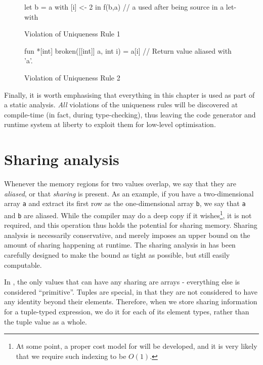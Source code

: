 \begin{figure}
\centering
\begin{colorcode}
let b = a with [i] <- 2 in
f(b,a) //  a used after being source in a let-with
\end{colorcode}
\caption{Violation of Uniqueness Rule 1}
\label{fig:uniqueness-rule-1-violation}
\end{figure}

\begin{figure}
\centering
\begin{colorcode}
fun *[int] broken([[int]] a, int i) =
  a[i] // Return value aliased with 'a'.
\end{colorcode}
\caption{Violation of Uniqueness Rule 2}
\label{fig:uniqueness-rule-2-violation}
\end{figure}

Finally, it is worth emphasising that everything in this chapter is
used as part of a static analysis.  \textit{All} violations of the
uniqueness rules will be discovered at compile-time (in fact, during
type-checking), thus leaving the code generator and runtime system at
liberty to exploit them for low-level optimisation.

\section{Sharing analysis}
\label{sec:l0-sharing}

Whenever the memory regions for two values overlap, we say that they
are \textit{aliased}, or that \textit{sharing} is present.  As an
example, if you have a two-dimensional array \texttt{a} and extract
its first row as the one-dimensional array \texttt{b}, we say that
\texttt{a} and \texttt{b} are aliased.  While the \LO{} compiler may
do a deep copy if it wishes\footnote{At some point, a proper cost
  model for \LO{} will be developed, and it is very likely that we
  require such indexing to be $O(1)$.}, it is not required, and this
operation thus holds the potential for sharing memory.  Sharing
analysis is necessarily conservative, and merely imposes an upper
bound on the amount of sharing happening at runtime.  The sharing
analysis in \LO{} has been carefully designed to make the bound as
tight as possible, but still easily computable.

In \LO{}, the only values that can have any sharing are arrays -
everything else is considered ``primitive''.  Tuples are special, in
that they are not considered to have any identity beyond their
elements.  Therefore, when we store sharing information for a
tuple-typed expression, we do it for each of its element types, rather
than the tuple value as a whole.


